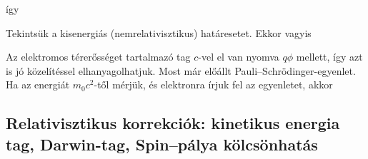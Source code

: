    így
   
   Tekintsük a kisenergiás (nemrelativisztikus) határesetet. Ekkor
   vagyis
   
   Az elektromos térerősséget tartalmazó tag $c$-vel el van nyomva $q\phi$ mellett, így azt is jó közelítéssel elhanyagolhatjuk. Most már előállt Pauli--Schrödinger-egyenlet. Ha az energiát $m_0c^2$-től mérjük, és elektronra írjuk fel az egyenletet, akkor 
   
  \subsection{Relativisztikus korrekciók: kinetikus energia tag, Darwin-tag, Spin--pálya kölcsönhatás}
   
